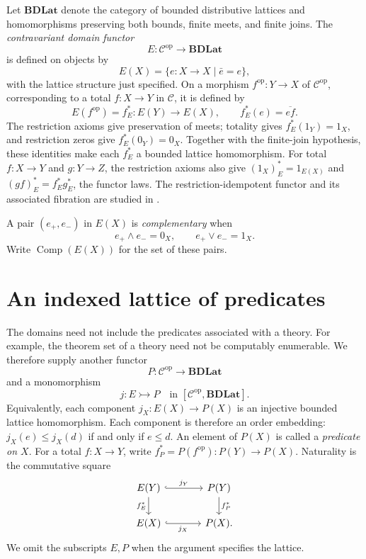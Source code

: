 \documentclass[11pt]{article}
\theoremstyle{definition}
\newcommand{\C}{\mathcal C}
\newcommand{\BDLat}{\mathbf{BDLat}}
\newcommand{\Comp}{\operatorname{Comp}}
\begin{document}
Let $\BDLat$ denote the category of bounded distributive lattices and
homomorphisms preserving both bounds, finite meets, and finite joins.
The \emph{contravariant domain functor}
\[
 E:\C^{\mathrm{op}}\longrightarrow\BDLat
\]
is defined on objects by
\[
 E(X)=\{e:X\to X\mid\bar e=e\},
\]
with the lattice structure just specified. On a morphism
$f^{\mathrm{op}}:Y\to X$ of $\C^{\mathrm{op}}$, corresponding to a
total $f:X\to Y$ in $\C$, it is defined by
\[
 E(f^{\mathrm{op}})=f_E^*:E(Y)\longrightarrow E(X),
 \qquad f_E^*(e)=\overline{ef}.
\]
The restriction axioms give preservation of meets;
totality gives $f_E^*(1_Y)=1_X$, and restriction zeros give
$f_E^*(0_Y)=0_X$. Together with the finite-join hypothesis, these
identities make each $f_E^*$ a bounded lattice homomorphism.
For total $f:X\to Y$ and $g:Y\to Z$, the restriction axioms also give
$(1_X)_E^*=1_{E(X)}$ and $(gf)_E^*=f_E^*g_E^*$, the functor laws.
The restriction-idempotent functor and its associated fibration are
studied in \cite[Sections~4.1--4.2]{RestrictionI}.

A pair $(e_+,e_-)$ in $E(X)$ is \emph{complementary} when
\[
 e_+\wedge e_-=0_X,\qquad e_+\vee e_-=1_X.
\]
Write $\Comp(E(X))$ for the set of these pairs.

\section{An indexed lattice of predicates}

The domains need not include the predicates associated with a theory.
For example, the theorem set of a theory need not be computably enumerable.
We therefore supply another functor
\[
 P:\C^{\mathrm{op}}\longrightarrow\BDLat
\]
and a monomorphism
\[
 j:E\rightarrowtail P
 \quad\text{in }[\C^{\mathrm{op}},\BDLat].
\]
Equivalently, each component $j_X:E(X)\to P(X)$ is an injective
bounded lattice homomorphism. Each component is therefore an order
embedding: $j_X(e)\leq j_X(d)$ if and only if $e\leq d$.
An element of $P(X)$ is called a \emph{predicate on $X$}.
For a total $f:X\to Y$, write $f_P^*=P(f^{\mathrm{op}}):P(Y)\to P(X)$.
Naturality is the commutative square
\begin{equation}\label{eq:naturality}
\begin{tikzcd}[column sep=large]
 E(Y) \arrow[r,hook,"j_Y"] \arrow[d,"f_E^*"']
   & P(Y) \arrow[d,"f_P^*"] \\
 E(X) \arrow[r,hook,"j_X"'] & P(X).
\end{tikzcd}
\end{equation}
We omit the subscripts $E,P$ when the argument specifies the lattice.
\end{document}
